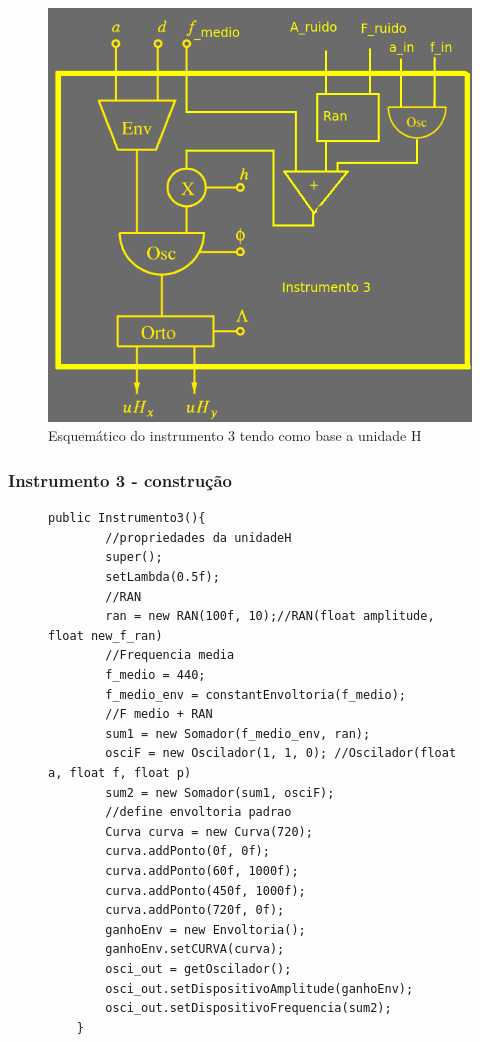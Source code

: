 \documentclass{beamer}
\begin{document}
\begin{frame}
 \begin{figure}
  \includegraphics[scale=0.4]{./images/instrumento3.png}
  \caption{Esquemático do instrumento 3 tendo como base a unidade H}
 \end{figure} 
\end{frame}


 \begin{frame}[fragile]
 \frametitle{Instrumento 3 - construção}
 \begin{figure}
 	\centering
 	\begin{lstlisting}
public Instrumento3(){
		//propriedades da unidadeH
		super();
		setLambda(0.5f);
		//RAN
		ran = new RAN(100f, 10);//RAN(float amplitude, float new_f_ran)		
		//Frequencia media
		f_medio = 440;
		f_medio_env = constantEnvoltoria(f_medio);
		//F medio + RAN
		sum1 = new Somador(f_medio_env, ran);
		osciF = new Oscilador(1, 1, 0); //Oscilador(float a, float f, float p) 
		sum2 = new Somador(sum1, osciF);
		//define envoltoria padrao
		Curva curva = new Curva(720);
		curva.addPonto(0f, 0f);
		curva.addPonto(60f, 1000f);
		curva.addPonto(450f, 1000f);
		curva.addPonto(720f, 0f);
		ganhoEnv = new Envoltoria();
		ganhoEnv.setCURVA(curva);
		osci_out = getOscilador();
		osci_out.setDispositivoAmplitude(ganhoEnv);
		osci_out.setDispositivoFrequencia(sum2);
	}    			\end{lstlisting}
	\caption{}	
	\end{figure}
\end{frame}
\end{document}
